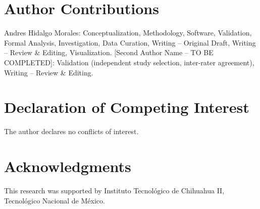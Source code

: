\documentclass[review,3p,times]{elsarticle}
\begin{document}
\section*{Author Contributions}
Andres Hidalgo Morales: Conceptualization, Methodology, Software, Validation, Formal Analysis, Investigation, Data Curation, Writing -- Original Draft, Writing -- Review \& Editing, Visualization.
[Second Author Name -- TO BE COMPLETED]: Validation (independent study selection, inter-rater agreement), Writing -- Review \& Editing.

\section*{Declaration of Competing Interest}
The author declares no conflicts of interest.

\section*{Acknowledgments}
This research was supported by Instituto Tecnológico de Chihuahua II, Tecnológico Nacional de México.



\end{document}
